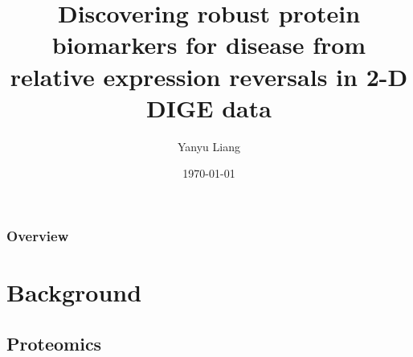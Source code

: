 \documentclass{beamer}
\title[Computational Medicine Paper Club]{Discovering robust protein biomarkers for disease from relative expression reversals in 2-D DIGE data \cite{anderson2007discovering}} %
\author{Yanyu Liang} %
\institute[CMU] %
{
Carnegie Mellon University \\ %
\medskip
\textit{yanyul@andrew.cmu.edu} %
}
\date{\today} %
\begin{document}
\begin{frame}
\titlepage %
\end{frame}

\begin{frame}
\begin{multicols}{2}
\frametitle{Overview} %
\tableofcontents %
\end{multicols}
\end{frame}


\section{Background} %

\subsection{Proteomics} %
\end{document}
